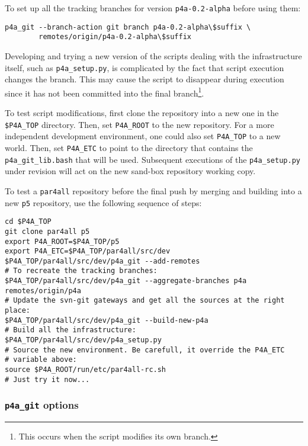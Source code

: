 \documentclass[a4paper]{article}
\begin{document}
To set up all the tracking branches for version
\texttt{p4a-0.2-alpha} before using them:
\begin{verbatim}
p4a_git --branch-action git branch p4a-0.2-alpha\$suffix \
        remotes/origin/p4a-0.2-alpha\$suffix
\end{verbatim}
\texttt{}
Developing and trying a new version of the scripts dealing with
the \Apfa infrastructure itself, such as \verb|p4a_setup.py|, is
complicated by the fact that script execution changes the branch. This may
cause the script to disappear during execution since it has not been
committed into the final branch\footnote{This occurs when the script
  modifies its own branch. \smiley}.

To test script modifications, first clone the repository into a new
one in the \verb|$P4A_TOP| %
directory. Then, set \verb|P4A_ROOT| to the new repository.
For a more independent development environment, one could also set
\verb|P4A_TOP| to a new world.
Then, set \verb|P4A_ETC| to point to the directory
that contains the \verb|p4a_git_lib.bash| that will be
used. Subsequent executions of the \verb|p4a_setup.py| under revision
will act on the new sand-box repository working copy.

To test a \texttt{par4all} repository before the final push by
merging and building into a new \texttt{p5} repository, use the
following sequence of steps:
\begin{verbatim}
cd $P4A_TOP
git clone par4all p5
export P4A_ROOT=$P4A_TOP/p5
export P4A_ETC=$P4A_TOP/par4all/src/dev
$P4A_TOP/par4all/src/dev/p4a_git --add-remotes
# To recreate the tracking branches:
$P4A_TOP/par4all/src/dev/p4a_git --aggregate-branches p4a remotes/origin/p4a
# Update the svn-git gateways and get all the sources at the right place:
$P4A_TOP/par4all/src/dev/p4a_git --build-new-p4a
# Build all the infrastructure:
$P4A_TOP/par4all/src/dev/p4a_setup.py
# Source the new environment. Be carefull, it override the P4A_ETC
# variable above:
source $P4A_ROOT/run/etc/par4all-rc.sh
# Just try it now...
\end{verbatim}


\subsubsection{\protect\texttt{p4a\_git} options}
\label{sec:p4a_git-options}
\end{document}

